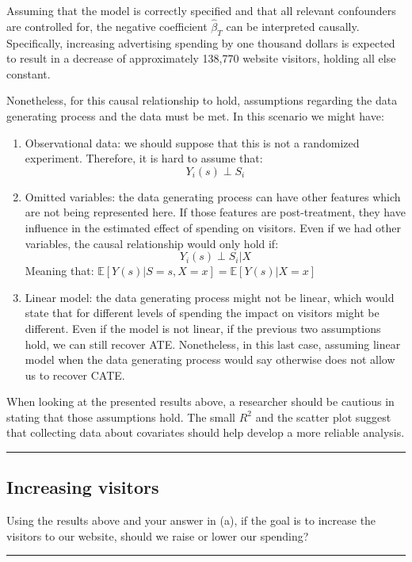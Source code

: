 \documentclass{article}
\newenvironment{colorparagraph}[1]{\par\color{#1}}{\par}
\begin{document}
Assuming that the model is correctly specified and that all relevant confounders are controlled for, the negative coefficient \(\hat{\beta}_T\) can be interpreted causally. Specifically, increasing advertising spending by one thousand dollars is expected to result in a decrease of approximately 138,770 website visitors, holding all else constant.

Nonetheless, for this causal relationship to hold, assumptions regarding the data generating process and the data must be met. In this scenario we might have:

\begin{enumerate}
  \item Observational data: we should suppose that this is not a randomized experiment. Therefore, it is hard to assume that:
  $$
  Y_i (s) \perp S_i
  $$
  \item Omitted variables: the data generating process can have other features which are not being represented here. If those features are post-treatment, they have influence in the estimated effect of spending on visitors. Even if we had other variables, the causal relationship would only hold if:
  $$
  Y_i (s) \perp S_i | X
  $$
  Meaning that: $\mathbb{E}[Y(s) | S = s, X = x] = \mathbb{E}[Y(s) | X = x]$
  \item Linear model: the data generating process might not be linear, which would state that for different levels of spending the impact on visitors might be different. Even if the model is not linear, if the previous two assumptions hold, we can still recover ATE. Nonetheless, in this last case, assuming linear model when the data generating process would say otherwise does not allow us to recover CATE.
\end{enumerate}

When looking at the presented results above, a researcher should be cautious in stating that those assumptions hold. The small $R^2$ and the scatter plot suggest that collecting data about covariates should help develop a more reliable analysis.

\begin{colorparagraph}{questioncolor}
\rule{\textwidth}{0.5pt}

\label{q4b}\subsection{Increasing visitors}
Using the results above and your answer in (a), if the goal is to increase the visitors to our website, should we raise or lower our spending?

\rule{\textwidth}{0.5pt}
\end{colorparagraph}
\end{document}
